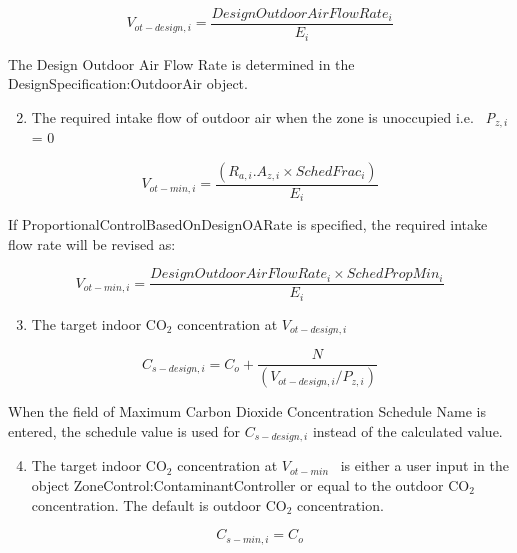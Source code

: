 \begin{equation}
{V_{ot - design,i}} = \frac{Design Outdoor Air Flow Rate_i} {E_i}
\end{equation}

The Design Outdoor Air Flow Rate is determined in the DesignSpecification:OutdoorAir object. 

\begin{enumerate}
\setcounter{enumi}{1}
\item The required intake flow of outdoor air when the zone is unoccupied i.e.~ \emph{P\(_{z,i}\)} = 0
\end{enumerate}

\begin{equation}
{V_{ot - min,i}} = \frac{{({R_{a,i}}.{A_{z,i}} \times {SchedFrac_i})}}{{{E_i}}}
\end{equation}

If ProportionalControlBasedOnDesignOARate is specified, the required intake flow rate will be revised as:

\begin{equation}
{V_{ot - min,i}} = \frac{ {Design Outdoor Air Flow Rate_i} \times {SchedPropMin_i} } {E_i}
\end{equation}

\begin{enumerate}
\setcounter{enumi}{2}
\item The target indoor CO\(_{2}\) concentration at \({V_{ot - design,i}}\)
\end{enumerate}

\begin{equation}
{C_{s - design,i}} = {C_o} + \frac{N}{{\left( {{V_{ot - design,i}}/{P_{z,i}}} \right)}}
\end{equation}

When the field of Maximum Carbon Dioxide Concentration Schedule Name is entered, the schedule value is used for {$C_{s - design,i}$} instead of the calculated value. 

\begin{enumerate}
\setcounter{enumi}{3}
\item The target indoor CO\(_{2}\) concentration at \({V_{ot - min}}\) ~is either a user input in the object ZoneControl:ContaminantController or equal to the outdoor CO\(_{2}\) concentration. The default is outdoor CO\(_{2}\) concentration.
\end{enumerate}

\begin{equation}
{C_{s - min,i}} = {C_o}
\end{equation}


